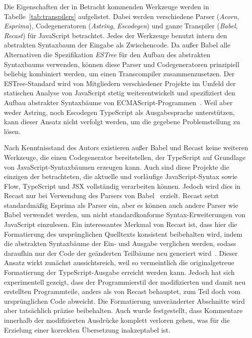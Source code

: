 

Die Eigenschaften der in Betracht kommenden Werkzeuge werden in Tabelle~\ref{tab:transpilers} aufgelistet. Dabei werden verschiedene Parser (\textit{Acorn}, \textit{Esprima}), Codegeneratoren (\textit{Astring}, \textit{Escodegen}) und ganze Transpiler (\textit{Babel}, \textit{Recast}) für JavaScript betrachtet. Jedes der Werkzeuge benutzt intern den abstrakten Syntaxbaum der Eingabe als Zwischencode. Da außer Babel alle Alternativen die Spezifikation \textit{ESTree} für den Aufbau des abstrakten Syntaxbaums verwenden, können diese Parser und Codegeneratoren prinzipiell beliebig kombiniert werden, um einen Transcompiler zusammenzusetzen. Der ESTree-Standard wird von Mitgliedern verschiedener Projekte im Umfeld der statischen Analyse von JavaScript stetig weiterentwickelt und spezifiziert den Aufbau abstrakter Syntaxbäume von ECMAScript-Programmen~\autocite{ESTREE_SPEC}. Weil aber weder Astring, noch Escodegen TypeScript als Ausgabesprache unterstützen, kann dieser Ansatz nicht verfolgt werden, um die gegebene Problemstellung zu lösen.

Nach Kenntnisstand des Autors existieren außer Babel und Recast keine weiteren Werkzeuge, die einen Codegenerator bereitstellen, der TypeScript auf Grundlage von JavaScript-Syntaxbäumen erzeugen kann. Auch sind diese Projekte die einzigen der betrachteten, die aktuelle und vorläufige JavaScript-Syntax sowie Flow, TypeScript und JSX vollständig verarbeiten können. Jedoch wird dies in Recast nur bei Verwendung des Parsers von Babel~\autocite{BABEL:PARSER} erzielt. Recast setzt standardmäßig Esprima als Parser ein, aber es können auch andere Parser wie Babel verwendet werden, um nicht standardkonforme Syntax-Erweiterungen von JavaScript einzulesen. Ein interessantes Merkmal von Recast ist, dass hier die Formatierung des ursprünglichen Quelltexts konsistent beibehalten wird, indem die abstrakten Syntaxbäume der Ein- und Ausgabe verglichen werden, sodass daraufhin nur der Code der geänderten Teilbäume neu generiert wird~\autocite{RECAST}. Dieser Ansatz wirkt zunächst aussichtsreich, weil so vermeintlich die originalgetreue Formatierung der TypeScript-Ausgabe erreicht werden kann. Jedoch hat sich experimentell gezeigt, dass der Programmierstil der modifizierten und damit neu erstellten Programmteile, anders als von Recast behauptet, zum Teil doch vom ursprünglichen Code abweicht. Die Formatierung unveränderter Abschnitte wird aber tatsächlich präzise beibehalten. Auch wurde festgestellt, dass Kommentare innerhalb der modifizierten Ausdrücke komplett verloren gehen, was für die Erzielung einer korrekten Übersetzung inakzeptabel ist.

